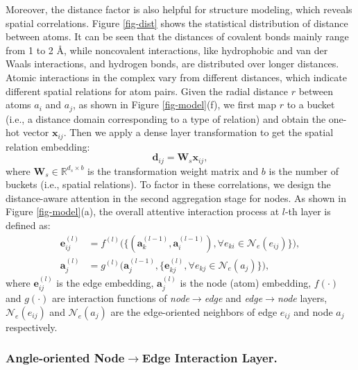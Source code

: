 \documentclass[sigconf]{acmart}
\begin{document}
Moreover, the distance factor is also helpful for structure modeling, which reveals spatial correlations. Figure \ref{fig-dist} shows the statistical distribution of distance between atoms. It can be seen that the distances of covalent bonds mainly range from 1 to 2 {\AA}, while noncovalent interactions, like hydrophobic and van der Waals interactions, and hydrogen bonds, are distributed over longer distances. Atomic interactions in the complex vary from different distances, which indicate different spatial relations for atom pairs. Given the radial distance $r$ between atoms $a_i$ and $a_j$, as shown in Figure \ref{fig-model}(f), we first map $r$ to a bucket (i.e., a distance domain corresponding to a type of relation) and obtain the one-hot vector $\bm{x}_{ij}$. Then we apply a dense layer transformation to get the spatial relation embedding:
\begin{equation}
\label{eq-embed}
    \bm{d}_{ij} = \bm{W}_s \bm{x}_{ij},
\end{equation}
where $\bm{W}_s \in \mathbb{R}^{d_s \times b}$ is the transformation weight matrix and $b$ is the number of buckets (i.e., spatial relations). To factor in these correlations, we design the distance-aware attention in the second aggregation stage for nodes. As shown in Figure \ref{fig-model}(a), the overall attentive interaction process at $l$-th layer is defined as:
\begin{align}
    \label{eq-node-and-edge}
\bm{e}_{ij}^{(l)} &= f^{(l)} \Big ( \big\{(\bm{a}_k^{(l-1)}, \bm{a}_i^{(l-1)}), \forall e_{ki} \in \mathcal{N}_{e}(e_{ij}) \big\} \Big ),
    \\
    \bm{a}_{j}^{(l)} &= g^{(l)} \Big ( \bm{a}_j^{(l-1)}, \big\{\bm{e}_{kj}^{(l)}, \forall e_{kj} \in \mathcal{N}_{e}(a_{j}) \big\} \Big ),
\end{align}
where $\bm{e}_{ij}^{(l)}$ is the edge embedding, $\bm{a}_{j}^{(l)}$ is the node (atom) embedding, $f(\cdot)$ and $g(\cdot)$ are interaction functions of \textit{node$\rightarrow$edge} and \textit{edge$\rightarrow$node} layers, $\mathcal{N}_{e}(e_{ij})$ and $\mathcal{N}_{e}(a_{j})$ are the edge-oriented neighbors of edge $e_{ij}$ and node $a_j$ respectively.


\subsubsection{Angle-oriented Node$\rightarrow$Edge Interaction Layer.}
\end{document}
